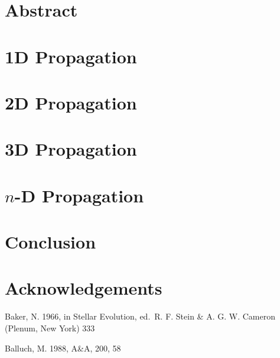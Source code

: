 \documentclass[conf]{new-aiaa}
\begin{document}
\newpage
\renewcommand\contentsname{Table of Contents}
\doublespacing
\tableofcontents
\singlespacing
{}
\newpage

\maketitle
\begin{abstract}


    
\end{abstract}

\newpage




\section{Abstract}

\section{1D Propagation}

\section{2D Propagation}
    
\section{3D Propagation}

\section{$n$-D Propagation}

\section{Conclusion}

\section{Acknowledgements}

    \begin{thebibliography}{}

     Baker, N. 1966,
        in Stellar Evolution,
        ed.\ R. F. Stein \& A. G. W. Cameron
        (Plenum, New York) 333

     Balluch, M. 1988,
        A\&A, 200, 58

    \end{thebibliography}

\newpage
\end{document}
